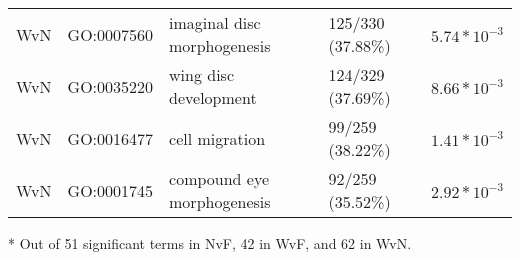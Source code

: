 \documentclass[landscape, 12pt]{article}
\begin{document}
\begin{table}
\begin{threeparttable}
\begin{tabular}{llllr}
  WvN & GO:0007560 & imaginal disc morphogenesis & 125/330 (37.88\%) & $5.74*10^{-3}$ \\ 
  WvN & GO:0035220 & wing disc development & 124/329 (37.69\%) & $8.66*10^{-3}$ \\ 
  WvN & GO:0016477 & cell migration & 99/259 (38.22\%) & $1.41*10^{-3}$ \\ 
  WvN & GO:0001745 & compound eye morphogenesis & 92/259 (35.52\%) & $2.92*10^{-3}$ \\ 
\hline
\end{tabular}
\begin{tablenotes}
	\item[*] Out of 51 significant terms in NvF, 42 in WvF, and 62 in WvN.
\end{tablenotes}
\end{threeparttable}
\end{table}
\end{document}
